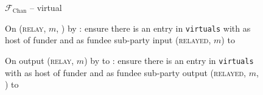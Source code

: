 \begin{figure}[H]
\begin{systembox}{$\mathcal{F}_{\mathrm{Chan}}$ -- virtual}
\begin{algorithmic}[1]
      \State On (\textsc{relay}, $m$, \charlie) by \alice:
      \Indent
        \State ensure there is an entry in \texttt{virtuals} with \alice as host
        of funder and \charlie as fundee sub-party
        \label{code:functionality:chan:skeleton:virtual:relay:input:start}
        \State input (\textsc{relayed}, $m$) to \charlie
        \label{code:functionality:chan:skeleton:virtual:relay:input:end}
      \EndIndent
      \Statex

      \State On output (\textsc{relay}, $m$) by \charlie to \alice:
      \Indent
        \State ensure there is an entry in \texttt{virtuals} with \alice as host
        of funder and \charlie as fundee sub-party 
        \label{code:functionality:chan:skeleton:virtual:relay:output:start}
        \State output (\textsc{relayed}, $m$, \charlie) to \environment
        \label{code:functionality:chan:skeleton:virtual:relay:output:end}
      \EndIndent
    \end{algorithmic}
  \end{systembox}
  \caption{}
  \label{code:functionality:chan:skeleton:virtual}
\end{figure}
